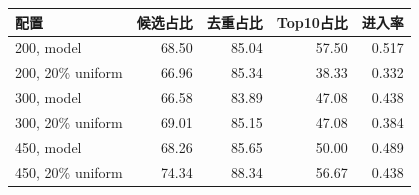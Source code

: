 \begin{tabular}{lrrrr}
\toprule
配置 & 候选占比 & 去重占比 & Top10占比 & 进入率 \\
\midrule
200, model & 68.50 & 85.04 & 57.50 & 0.517 \\
200, 20\% uniform & 66.96 & 85.34 & 38.33 & 0.332 \\
300, model & 66.58 & 83.89 & 47.08 & 0.438 \\
300, 20\% uniform & 69.01 & 85.15 & 47.08 & 0.384 \\
450, model & 68.26 & 85.65 & 50.00 & 0.489 \\
450, 20\% uniform & 74.34 & 88.34 & 56.67 & 0.438 \\
\bottomrule
\end{tabular}
